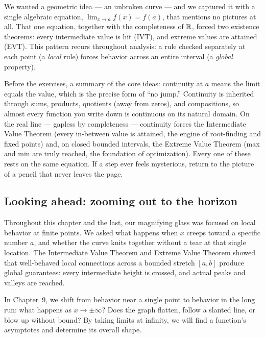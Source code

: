 \begin{aestheticbox}
We wanted a geometric idea --- an unbroken
curve --- and we captured it with a single algebraic equation,
$\lim_{x\to a}f(x)=f(a)$, that mentions no pictures at all. That one equation,
together with the completeness of $\mathbb{R}$, forced two existence theorems: every
intermediate value is hit (IVT), and extreme values are attained (EVT).
This pattern recurs throughout analysis: a rule checked separately at each point (a
\emph{local} rule) forces behavior across an entire interval (a \emph{global} property).
\end{aestheticbox}

\begin{recoverybox}
Before the exercises, a summary of the core ideas: continuity at $a$ means the limit
equals the value, which is the precise form of ``no jump.'' Continuity is inherited through
sums, products, quotients (away from zeros), and compositions, so almost every function you
write down is continuous on its natural domain. On the real line --- gapless by completeness
--- continuity forces the Intermediate Value Theorem (every in-between value is attained,
the engine of root-finding and fixed points) and, on closed bounded intervals, the Extreme
Value Theorem (max and min are truly reached, the foundation of optimization). Every one of
these rests on the same equation. If a step ever feels mysterious, return to the
picture of a pencil that never leaves the page.
\end{recoverybox}

\subsection*{Looking ahead: zooming out to the horizon}

Throughout this chapter and the last, our magnifying glass was focused on local behavior at
finite points. We asked what happens when $x$ creeps toward a specific number $a$, and
whether the curve knits together without a tear at that single location. The Intermediate
Value Theorem and Extreme Value Theorem showed that well-behaved local connections across a
bounded stretch $[a,b]$ produce global guarantees: every intermediate height is crossed,
and actual peaks and valleys are reached.

In Chapter~9, we shift from behavior near a single point to behavior in the long run: what
happens as $x \to \pm\infty$? Does the graph flatten, follow a slanted line, or blow
up without bound? By taking limits at infinity, we will find a function's asymptotes and
determine its overall shape.

